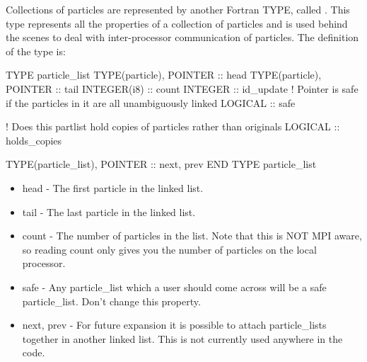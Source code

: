 Collections of particles are represented by another Fortran TYPE, called
. This type represents all the properties of a
collection of particles and is used behind the scenes to deal with
inter-processor communication of particles. The definition of the type is:
\begin{boxverbatim}
  TYPE particle_list
    TYPE(particle), POINTER :: head
    TYPE(particle), POINTER :: tail
    INTEGER(i8) :: count
    INTEGER :: id_update
    ! Pointer is safe if the particles in it are all unambiguously linked
    LOGICAL :: safe

    ! Does this partlist hold copies of particles rather than originals
    LOGICAL :: holds_copies

    TYPE(particle_list), POINTER :: next, prev
  END TYPE particle_list
\end{boxverbatim}
\begin{itemize}
\item head - The first particle in the linked list.
\item tail - The last particle in the linked list.
\item count - The number of particles in the list. Note that this is NOT MPI
  aware, so reading count only gives you the number of particles on the local
  processor.
\item safe - Any particle\_list which a user should come across will be a safe
  particle\_list. Don't change this property.
\item next, prev - For future expansion it is possible to attach particle\_lists
  together in another linked list. This is not currently used anywhere in the
  code.
\end{itemize}

